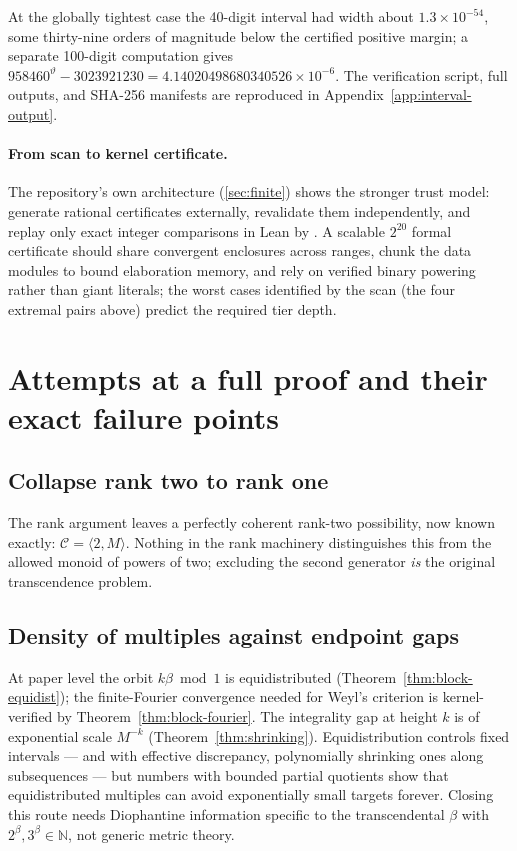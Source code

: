 \documentclass[11pt,oneside]{article}
\theoremstyle{definition}
\theoremstyle{remark}
\newcommand{\N}{\mathbb N}
\newcommand{\thetaq}{\vartheta}
\newcommand{\Cand}{\mathcal C}
\newcommand{\lean}[1]{\texttt{\detokenize{#1}}}
\begin{document}
At the globally tightest case the 40-digit interval had width about $1.3\times10^{-54}$,
some thirty-nine orders of magnitude below the certified positive margin; a separate
100-digit computation gives
$958460^{\thetaq}-3023921230=4.14020498680340526\times10^{-6}$.  The verification script,
full outputs, and SHA-256 manifests are reproduced in Appendix~\ref{app:interval-output}.

\paragraph{From scan to kernel certificate.}
The repository's own architecture (\cref{sec:finite}) shows the stronger trust model:
generate rational certificates externally, revalidate them independently, and replay only
exact integer comparisons in Lean by \lean{decide}.  A scalable $2^{20}$ formal certificate
should share convergent enclosures across ranges, chunk the data modules to bound
elaboration memory, and rely on verified binary powering rather than giant literals; the
worst cases identified by the scan (the four extremal pairs above) predict the required tier
depth.

\section{Attempts at a full proof and their exact failure points}
\label{sec:attempts}

\subsection{Collapse rank two to rank one}
The rank argument leaves a perfectly coherent rank-two possibility, now known exactly:
$\Cand=\langle2,M\rangle$.  Nothing in the rank machinery distinguishes this from the
allowed monoid of powers of two; excluding the second generator \emph{is} the original
transcendence problem.

\subsection{Density of multiples against endpoint gaps}
At paper level the orbit $k\beta\bmod1$ is equidistributed
(Theorem~\ref{thm:block-equidist}); the finite-Fourier convergence needed for Weyl's criterion
is kernel-verified by Theorem~\ref{thm:block-fourier}.  The
integrality gap at height $k$ is of exponential scale $M^{-k}$
(Theorem~\ref{thm:shrinking}).  Equidistribution controls fixed intervals --- and with effective
discrepancy, polynomially shrinking ones along subsequences --- but numbers with bounded
partial quotients show that equidistributed multiples can avoid exponentially small targets
forever.  Closing this route needs Diophantine information specific to the transcendental
$\beta$ with $2^{\beta},3^{\beta}\in\N$, not generic metric theory.
\end{document}
